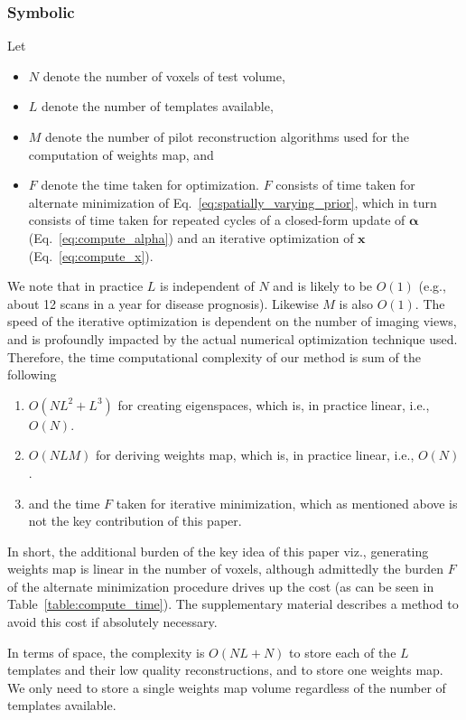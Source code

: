 \documentclass[journal]{IEEEtran}
\begin{document}
\subsubsection{Symbolic}
Let
\begin{itemize}
\item $N$ denote the number of voxels of test volume,
\item $L$ denote the number of templates available,
\item $M$ denote the number of pilot reconstruction algorithms used for the computation of weights map, and
\item $F$ denote the time taken for optimization.
  $F$ consists of time taken for alternate minimization of Eq.~\ref{eq:spatially_varying_prior}, which in turn consists of time taken for repeated cycles of a closed-form update of $\boldsymbol{\alpha}$ (Eq.~\ref{eq:compute_alpha}) and an iterative optimization of  $\boldsymbol{x}$ (Eq.~\ref{eq:compute_x}). 
\end{itemize}
We note that in practice $L$ is independent of $N$ and is likely to be
$O(1)$ (e.g., about 12 scans in a year for disease prognosis).
Likewise $M$ is also $O(1)$. The speed of the iterative optimization
is dependent on the number of imaging views, and is profoundly
impacted by the actual numerical optimization technique used.
Therefore, the time computational complexity of our method is sum of
the following
\begin{enumerate}
\item $O(NL^2+L^3)$ for creating eigenspaces, which is, in practice linear, i.e., $O(N)$.
\item $O(NLM)$ for deriving weights map, which is, in practice linear, i.e., $O(N)$.
\item and the time $F$  taken for iterative minimization, which as mentioned above is not the key contribution of this paper. 
\end{enumerate}
In short, the additional burden of the key idea of this paper viz.,
generating weights map is linear in the number of voxels, although
admittedly the burden $F$ of the alternate minimization procedure
drives up the cost (as can be seen in
Table~\ref{table:compute_time}). The supplementary material describes
a method to avoid this cost if absolutely necessary.

In terms of space, the complexity is $O(NL +N)$ to store each of the
$L$ templates and their low quality reconstructions, and to store one
weights map. We only need to store a single weights map volume
regardless of the number of templates available.
\end{document}
